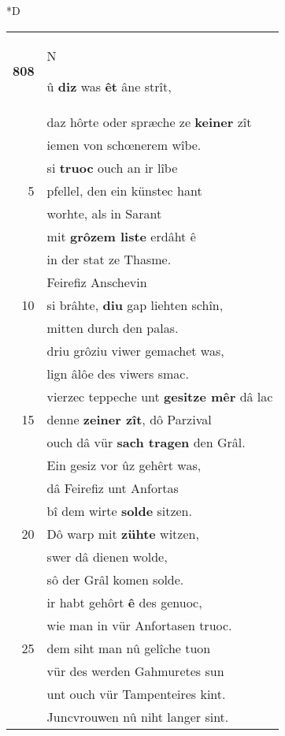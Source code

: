 \documentclass[8pt,a4paper,notitlepage]{article}
\begin{document}
\begin{table}[ht]
\begin{minipage}[t]{0.5\linewidth}
\small
\begin{center}*D
\end{center}
\begin{tabular}{rl}
\textbf{808} & \begin{large}N\end{large}û \textbf{diz} was \textbf{êt} âne strît,\\ 
 & daz hôrte oder spræche ze \textbf{keiner} zît\\ 
 & iemen von schœnerem wîbe.\\ 
 & si \textbf{truoc} ouch an ir lîbe\\ 
5 & pfellel, den ein künstec hant\\ 
 & worhte, als in Sarant\\ 
 & mit \textbf{grôzem liste} erdâht ê\\ 
 & in der stat ze Thasme.\\ 
 & Feirefiz Anschevin\\ 
10 & si brâhte, \textbf{diu} gap liehten schîn,\\ 
 & mitten durch den palas.\\ 
 & driu grôziu viwer gemachet was,\\ 
 & lign âlôe des viwers smac.\\ 
 & vierzec teppeche unt \textbf{gesitze mêr} dâ lac\\ 
15 & denne \textbf{zeiner zît}, dô Parzival\\ 
 & ouch dâ vür \textbf{sach tragen} den Grâl.\\ 
 & Ein gesiz vor ûz gehêrt was,\\ 
 & dâ Feirefiz unt Anfortas\\ 
 & bî dem wirte \textbf{solde} sitzen.\\ 
20 & Dô warp mit \textbf{zühte} witzen,\\ 
 & swer dâ dienen wolde,\\ 
 & sô der Grâl komen solde.\\ 
 & ir habt gehôrt \textbf{ê} des genuoc,\\ 
 & wie man in vür Anfortasen truoc.\\ 
25 & dem siht man nû gelîche tuon\\ 
 & vür des werden Gahmuretes sun\\ 
 & unt ouch vür Tampenteires kint.\\ 
 & Juncvrouwen nû niht langer sint.\\ 

\end{tabular}
\end{minipage}
\end{table}
\end{document}
